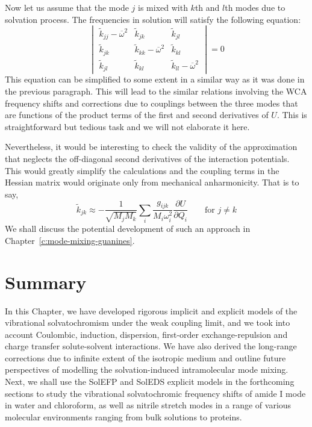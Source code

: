 \documentclass[a4paper,titlepage,twoside,fleqn,12pt]{book}
\newcommand{\fderiv}[2]{\ensuremath{
    \frac{\partial #1}{\partial #2}}}
\begin{document}
\begin{refsection}
Now let us assume that the mode $j$ is mixed with $k$th and $l$th modes
due to solvation process. The frequencies in solution will satisfy the following
equation:
%
\begin{equation}
\begin{vmatrix}
\tilde{k}_{jj} - \overline{\omega}^2 & \tilde{k}_{jk}                       & \tilde{k}_{jl}                       \\ 
\tilde{k}_{jk}                       & \tilde{k}_{kk} - \overline{\omega}^2 & \tilde{k}_{kl}                       \\ 
\tilde{k}_{jl}                       & \tilde{k}_{kl}                       & \tilde{k}_{ll} - \overline{\omega}^2
\end{vmatrix}
= 0
\end{equation}
%
This equation can be simplified to some extent in a similar way
as it was done in the previous paragraph. This will lead to the
similar relations involving the WCA frequency shifts and
corrections due to couplings between the three modes that are
functions of the product terms of the first and second derivatives
of $U$. This is straightforward but tedious task and we will not
elaborate it here.

Nevertheless, it would be interesting to check the validity
of the approximation that neglects the off\hyp{}diagonal second
derivatives of the interaction potentials. This would greatly 
simplify the calculations and the coupling terms in the Hessian
matrix would originate only from mechanical anharmonicity.
That is to say,
%
\begin{equation} 
 \tilde{k}_{jk} \approx - \frac{1}{\sqrt{M_jM_k}}\sum_i  
                             \frac{g_{ijk}}{M_i\omega_i^2}\fderiv{U}{Q_i} \qquad \text{for $j\ne k$} 
\end{equation}
%
We shall discuss the potential development of such an approach
in Chapter~\ref{c:mode-mixing-guanines}.

\section{Summary}

In this Chapter, we have developed rigorous implicit and
explicit models of the vibrational solvatochromism under
the weak coupling limit, and we took into account
Coulombic, induction, dispersion, first\hyp{}order 
exchange\hyp{}repulsion and charge transfer solute\hyp{}solvent
interactions. We have also derived the long\hyp{}range
corrections due to infinite extent of the isotropic medium
and outline future perspectives of modelling the solvation\hyp{}induced
intramolecular mode mixing. 
Next, we shall use the SolEFP and SolEDS explicit models
in the forthcoming sections to study the vibrational solvatochromic
frequency shifts of amide I mode in water and chloroform, 
as well as nitrile stretch modes in a range of various molecular
environments ranging from bulk solutions to proteins.



\end{refsection}
\end{document}
